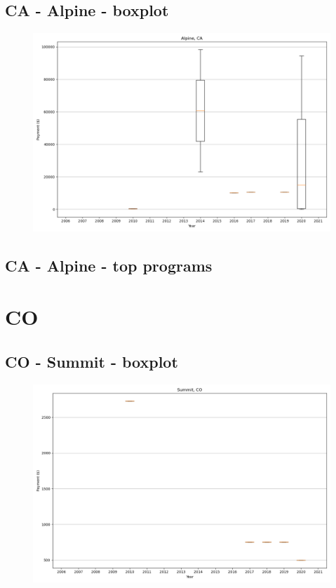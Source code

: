 \subsection*{CA - Alpine - boxplot}
\begin{figure}[h]
\centering
\includegraphics[width=7in]{../output/boxplots/counties/Alpine-CA_boxplot.png}
\end{figure}


\subsection*{CA - Alpine - top programs}

\newpage
\section*{CO}
\subsection*{CO - Summit - boxplot}
\begin{figure}[h]
\centering
\includegraphics[width=7in]{../output/boxplots/counties/Summit-CO_boxplot.png}
\end{figure}


